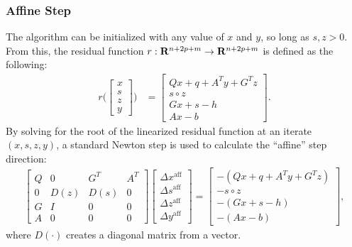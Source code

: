 \subsubsection{Affine Step}
%
The algorithm can be initialized with any value of $x$ and $y$, so long as $s,z>0$. From this, the residual function $r : \mathbf{R}^{n + 2p + m} \rightarrow \mathbf{R}^{n + 2p + m}$ is defined as the following:
%
\begin{align}
    r \bigg( \begin{bmatrix} x \\ s \\ z \\ y \end{bmatrix} \bigg) &= \begin{bmatrix} Qx + q + A^Ty + G^Tz \\ s \circ z \\ Gx + s - h \\ Ax - b \end{bmatrix}.
\end{align}
%
By solving for the root of the linearized residual function at an iterate $(x,s,z,y)$, a standard Newton step is used to calculate the ``affine'' step direction:
%
\begin{align}
    \begin{bmatrix}
Q & 0 & G^{T} & A^{T} \\
0 & D(z) & D(s) & 0 \\
G & I & 0 & 0 \\
A & 0 & 0 & 0
\end{bmatrix} \begin{bmatrix}
\Delta x^\text{aff} \\
\Delta s^\text{aff} \\
\Delta z^\text{aff} \\
\Delta y^\text{aff}
\end{bmatrix}=\begin{bmatrix}
-\left(Qx + q + A^Ty + G^Tz\right) \\
-s \circ z \\
-(G x+s-h) \\
-(A x-b)
\end{bmatrix}, \label{sec:background:ls_aff}
\end{align}
where $D(\cdot)$ creates a diagonal matrix from a vector.
%

